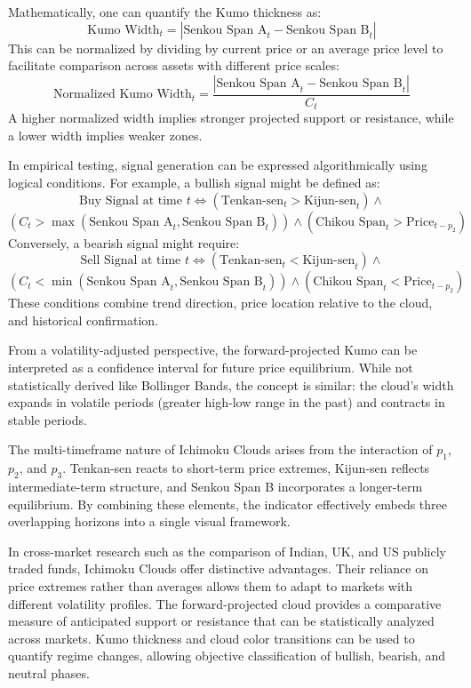 Mathematically, one can quantify the Kumo thickness as:
\[
\text{Kumo Width}_t = |\text{Senkou Span A}_t - \text{Senkou Span B}_t|
\]
This can be normalized by dividing by current price or an average price level to facilitate comparison across assets with different price scales:
\[
\text{Normalized Kumo Width}_t = \frac{|\text{Senkou Span A}_t - \text{Senkou Span B}_t|}{C_t}
\]
A higher normalized width implies stronger projected support or resistance, while a lower width implies weaker zones.

In empirical testing, signal generation can be expressed algorithmically using logical conditions. For example, a bullish signal might be defined as:
\[
\text{Buy Signal at time } t \iff ( \text{Tenkan-sen}_t > \text{Kijun-sen}_t ) \land 
\]
\[
( C_t > \max(\text{Senkou Span A}_t, \text{Senkou Span B}_t) ) \land ( \text{Chikou Span}_t > \text{Price}_{t-p_2} )
\]
Conversely, a bearish signal might require:
\[
\text{Sell Signal at time } t \iff ( \text{Tenkan-sen}_t < \text{Kijun-sen}_t ) \land 
\]
\[
( C_t < \min(\text{Senkou Span A}_t, \text{Senkou Span B}_t) ) \land ( \text{Chikou Span}_t < \text{Price}_{t-p_2} )
\]
These conditions combine trend direction, price location relative to the cloud, and historical confirmation.

From a volatility-adjusted perspective, the forward-projected Kumo can be interpreted as a confidence interval for future price equilibrium. While not statistically derived like Bollinger Bands, the concept is similar: the cloud's width expands in volatile periods (greater high-low range in the past) and contracts in stable periods.

The multi-timeframe nature of Ichimoku Clouds arises from the interaction of $p_1$, $p_2$, and $p_3$. Tenkan-sen reacts to short-term price extremes, Kijun-sen reflects intermediate-term structure, and Senkou Span B incorporates a longer-term equilibrium. By combining these elements, the indicator effectively embeds three overlapping horizons into a single visual framework.

In cross-market research such as the comparison of Indian, UK, and US publicly traded funds, Ichimoku Clouds offer distinctive advantages. Their reliance on price extremes rather than averages allows them to adapt to markets with different volatility profiles. The forward-projected cloud provides a comparative measure of anticipated support or resistance that can be statistically analyzed across markets. Kumo thickness and cloud color transitions can be used to quantify regime changes, allowing objective classification of bullish, bearish, and neutral phases.

